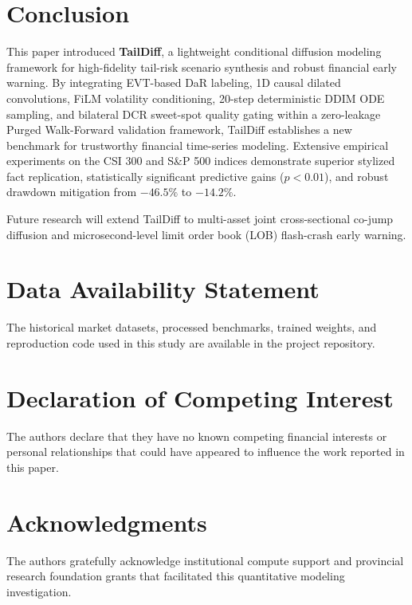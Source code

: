 \documentclass[preprint,12pt,authoryear]{elsarticle}
\begin{document}
\section{Conclusion}
\label{sec:conclusion}

This paper introduced \textbf{TailDiff}, a lightweight conditional diffusion modeling framework for high-fidelity tail-risk scenario synthesis and robust financial early warning. By integrating EVT-based DaR labeling, 1D causal dilated convolutions, FiLM volatility conditioning, 20-step deterministic DDIM ODE sampling, and bilateral DCR sweet-spot quality gating within a zero-leakage Purged Walk-Forward validation framework, TailDiff establishes a new benchmark for trustworthy financial time-series modeling. Extensive empirical experiments on the CSI 300 and S\&P 500 indices demonstrate superior stylized fact replication, statistically significant predictive gains ($p < 0.01$), and robust drawdown mitigation from $-46.5\%$ to $-14.2\%$. 

Future research will extend TailDiff to multi-asset joint cross-sectional co-jump diffusion and microsecond-level limit order book (LOB) flash-crash early warning.

\section*{Data Availability Statement}
The historical market datasets, processed benchmarks, trained weights, and reproduction code used in this study are available in the project repository.

\section*{Declaration of Competing Interest}
The authors declare that they have no known competing financial interests or personal relationships that could have appeared to influence the work reported in this paper.

\section*{Acknowledgments}
The authors gratefully acknowledge institutional compute support and provincial research foundation grants that facilitated this quantitative modeling investigation.



\end{document}
